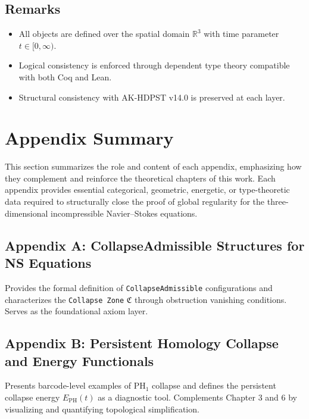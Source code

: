 \documentclass[11pt]{article}
\begin{document}
\subsection*{Remarks}

\begin{itemize}
  \item All objects are defined over the spatial domain $\mathbb{R}^3$ with time parameter $t \in [0,\infty)$.
  \item Logical consistency is enforced through dependent type theory compatible with both Coq and Lean.
  \item Structural consistency with AK-HDPST v14.0 is preserved at each layer.
\end{itemize}




\section*{Appendix Summary}

This section summarizes the role and content of each appendix, emphasizing how they complement and reinforce the theoretical chapters of this work. Each appendix provides essential categorical, geometric, energetic, or type-theoretic data required to structurally close the proof of global regularity for the three-dimensional incompressible Navier--Stokes equations.

\subsection*{Appendix A: CollapseAdmissible Structures for NS Equations}
Provides the formal definition of \texttt{CollapseAdmissible} configurations and characterizes the \texttt{Collapse Zone} $\mathfrak{C}$ through obstruction vanishing conditions. Serves as the foundational axiom layer.

\subsection*{Appendix B: Persistent Homology Collapse and Energy Functionals}
Presents barcode-level examples of $\mathrm{PH}_1$ collapse and defines the persistent collapse energy $E_{\mathrm{PH}}(t)$ as a diagnostic tool. Complements Chapter 3 and 6 by visualizing and quantifying topological simplification.
\end{document}
